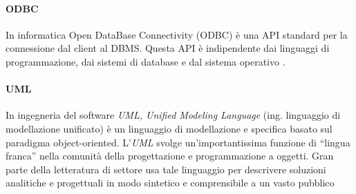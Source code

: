\paragraph{ODBC}
\label{ODBC}
In informatica Open DataBase Connectivity (ODBC) è una API standard per la connessione dal client al DBMS. Questa API è indipendente dai linguaggi di programmazione, dai sistemi di database e dal sistema operativo \cite{[27]}.

\paragraph{UML} 
\label{UMLl} 
In ingegneria del software \emph{UML, Unified Modeling Language} (ing. linguaggio di modellazione unificato) è un linguaggio di modellazione e specifica basato sul paradigma object-oriented. L'\emph{UML} svolge un'importantissima funzione di ``lingua franca'' nella comunità della progettazione e programmazione a oggetti. Gran parte della letteratura di settore usa tale linguaggio per descrivere soluzioni analitiche e progettuali in modo sintetico e comprensibile a un vasto pubblico


